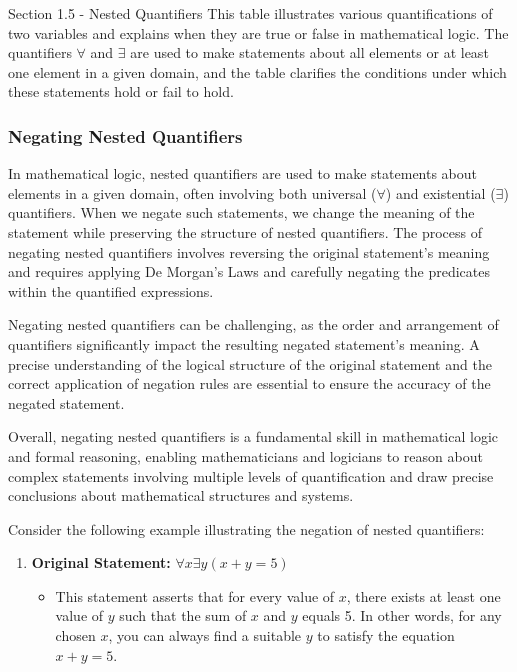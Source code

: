 \begin{notes}{Section 1.5 - Nested Quantifiers}
    This table illustrates various quantifications of two variables and explains when they are true or false in mathematical logic. The quantifiers \(\forall\) and \(\exists\) are used to make statements about all elements or at least one element in a given domain, 
    and the table clarifies the conditions under which these statements hold or fail to hold.

    \subsubsection*{Negating Nested Quantifiers}

    In mathematical logic, nested quantifiers are used to make statements about elements in a given domain, often involving both universal (\(\forall\)) and existential (\(\exists\)) quantifiers. When we negate such statements, we change the meaning of the statement 
    while preserving the structure of nested quantifiers. The process of negating nested quantifiers involves reversing the original statement's meaning and requires applying De Morgan's Laws and carefully negating the predicates within the quantified expressions.
    
    Negating nested quantifiers can be challenging, as the order and arrangement of quantifiers significantly impact the resulting negated statement's meaning. A precise understanding of the logical structure of the original statement and the correct application of 
    negation rules are essential to ensure the accuracy of the negated statement.
    
    Overall, negating nested quantifiers is a fundamental skill in mathematical logic and formal reasoning, enabling mathematicians and logicians to reason about complex statements involving multiple levels of quantification and draw precise conclusions about 
    mathematical structures and systems.

    \begin{highlight}
        Consider the following example illustrating the negation of nested quantifiers:
    
        \begin{enumerate}
            \item \textbf{Original Statement:} \(\forall x \exists y (x + y = 5)\)
            \begin{itemize}
                \item This statement asserts that for every value of \(x\), there exists at least one value of \(y\) such that the sum of \(x\) and \(y\) equals 5. In other words, for any chosen \(x\), you can always find a suitable \(y\) to satisfy the equation \(x + y = 5\).
            \end{itemize}
    

\end{enumerate}
\end{highlight}
\end{notes}
